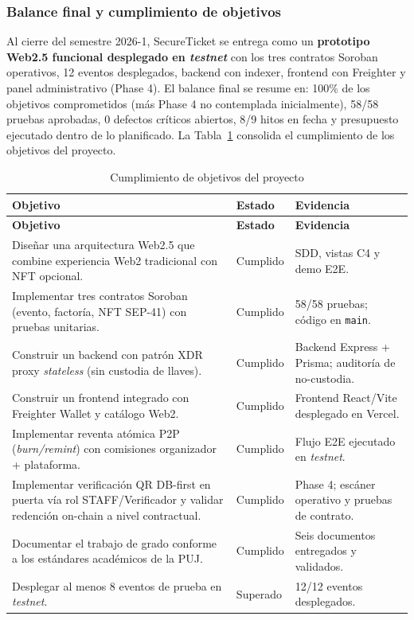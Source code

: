 \documentclass[12pt,oneside]{report}
\newcommand{\projectname}{SecureTicket}
\begin{document}
      \subsubsection{Balance final y cumplimiento de objetivos}
      Al cierre del semestre 2026-1, \projectname{} se entrega como un \textbf{prototipo Web2.5 funcional desplegado en \textit{testnet}} con los tres contratos Soroban operativos, 12 eventos desplegados, backend con indexer, frontend con Freighter y panel administrativo (Phase 4). El balance final se resume en: 100\% de los objetivos comprometidos (más Phase 4 no contemplada inicialmente), 58/58 pruebas aprobadas, 0 defectos críticos abiertos, 8/9 hitos en fecha y presupuesto ejecutado dentro de lo planificado. La Tabla~\ref{tab:cumplimiento-objetivos} consolida el cumplimiento de los objetivos del proyecto.

      \begin{longtable}{@{}p{8.5cm} p{2.2cm} p{4.0cm}@{}}
        \caption{Cumplimiento de objetivos del proyecto}
        \label{tab:cumplimiento-objetivos}\\
        \toprule
        \textbf{Objetivo} & \textbf{Estado} & \textbf{Evidencia}\\
        \midrule
        \endfirsthead
        \toprule
        \textbf{Objetivo} & \textbf{Estado} & \textbf{Evidencia}\\
        \midrule
        \endhead
        \bottomrule
        \endfoot
        Diseñar una arquitectura Web2.5 que combine experiencia Web2 tradicional con NFT opcional. & Cumplido & SDD, vistas C4 y demo E2E.\\
        Implementar tres contratos Soroban (evento, factoría, NFT SEP-41) con pruebas unitarias. & Cumplido & 58/58 pruebas; código en \texttt{main}.\\
        Construir un backend con patrón XDR proxy \textit{stateless} (sin custodia de llaves). & Cumplido & Backend Express + Prisma; auditoría de no-custodia.\\
        Construir un frontend integrado con Freighter Wallet y catálogo Web2. & Cumplido & Frontend React/Vite desplegado en Vercel.\\
        Implementar reventa atómica P2P (\textit{burn/remint}) con comisiones organizador + plataforma. & Cumplido & Flujo E2E ejecutado en \textit{testnet}.\\
        Implementar verificación QR DB-first en puerta vía rol STAFF/Verificador y validar redención on-chain a nivel contractual. & Cumplido & Phase 4; escáner operativo y pruebas de contrato.\\
        Documentar el trabajo de grado conforme a los estándares académicos de la PUJ. & Cumplido & Seis documentos entregados y validados.\\
        Desplegar al menos 8 eventos de prueba en \textit{testnet}. & Superado & 12/12 eventos desplegados.\\
      \end{longtable}
\end{document}
